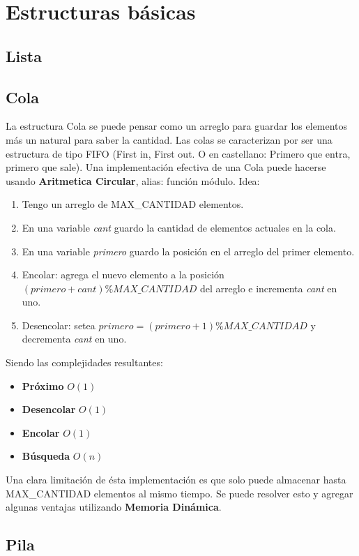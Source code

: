 \newpage
\section{Estructuras b\'asicas}
\subsection{Lista}
\subsection{Cola}

La estructura Cola se puede pensar como un arreglo para guardar los elementos m\'as un natural para saber la cantidad. Las colas se caracterizan por ser una estructura de tipo FIFO (First in, First out. O en castellano: Primero que entra, primero que sale).
Una implementaci\'on efectiva de una Cola puede hacerse usando \textbf{Aritmetica Circular}, alias: funci\'on m\'odulo. Idea:
\begin{enumerate}
 \item Tengo un arreglo de MAX\_CANTIDAD elementos.
 \item En una variable \textit{cant} guardo la cantidad de elementos actuales en la cola.
 \item En una variable \textit{primero} guardo la posici\'on en el arreglo del primer elemento.
 \item Encolar: agrega el nuevo elemento a la posici\'on $(primero + cant) \% MAX\_CANTIDAD$ del arreglo e  incrementa \textit{cant} en uno.
 \item Desencolar: setea $primero=(primero + 1) \% MAX\_CANTIDAD$ y decrementa \textit{cant} en uno.
\end{enumerate}
Siendo las complejidades resultantes:
\begin{itemize}
 \item \textbf{Pr\'oximo} $O(1)$
 \item \textbf{Desencolar} $O(1)$
 \item \textbf{Encolar} $O(1)$
 \item \textbf{B\'usqueda} $O(n)$
\end{itemize}
Una clara limitaci\'on de \'esta implementaci\'on es que solo puede almacenar hasta MAX\_CANTIDAD elementos al mismo tiempo. Se puede resolver esto y agregar algunas ventajas utilizando \textbf{Memoria Din\'amica}.

\subsection{Pila}
